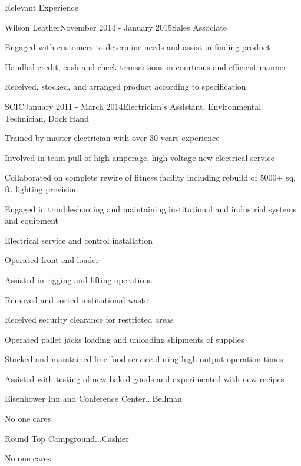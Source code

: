 \documentclass{resume} %
\begin{document}
\begin{rSection}{Relevant Experience}
\begin{rWorkSubsection}{Wilson Leather}{November 2014 - January 2015}{Sales Associate}{}
\item Engaged with customers to determine needs and assist in finding product
\item Handled credit, cash and check transactions in courteous and efficient manner
\item Received, stocked, and arranged product according to specification
\end{rWorkSubsection}


\begin{rWorkSubsection}{SCIC}{January 2011 - March 2014}{Electrician's Assistant, Environmental Technician, Dock Hand}{}
\item Trained by master electrician with over 30 years experience
\item Involved in team pull of high amperage, high voltage new electrical service
\item Collaborated on complete rewire of fitness facility including rebuild of 5000+ sq. ft. lighting provision
\item Engaged in troubleshooting and maintaining institutional and industrial systems and equipment
\item Electrical service and control installation
\item Operated front-end loader
\item Assisted in rigging and lifting operations
\item Removed and sorted institutional waste
\item Received security clearance for restricted areas
\item Operated pallet jacks loading and unloading shipments of supplies
\item Stocked and maintained line food service during high output operation times
\item Assisted with testing of new baked goods and experimented with new recipes
\end{rWorkSubsection}


\begin{rWorkSubsection}{Eisenhower Inn and Conference Center}{...}{Bellman}{}
\item No one cares
\end{rWorkSubsection}


\begin{rWorkSubsection}{Round Top Campground}{...}{Cashier}{}
\item No one cares
\end{rWorkSubsection}

\end{rSection}
\end{document}
